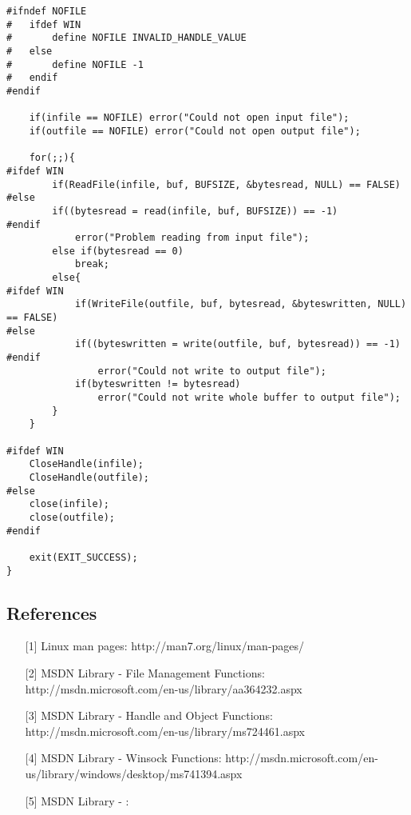 \documentclass[letterpaper,10pt,fleqn]{article}
\numberwithin{equation}{section}
\begin{document}
\begin{verbatim}
#ifndef NOFILE
#   ifdef WIN
#       define NOFILE INVALID_HANDLE_VALUE
#   else
#       define NOFILE -1
#   endif
#endif

    if(infile == NOFILE) error("Could not open input file");
    if(outfile == NOFILE) error("Could not open output file");

    for(;;){
#ifdef WIN
        if(ReadFile(infile, buf, BUFSIZE, &bytesread, NULL) == FALSE)
#else
        if((bytesread = read(infile, buf, BUFSIZE)) == -1)
#endif
            error("Problem reading from input file");
        else if(bytesread == 0)
            break;
        else{
#ifdef WIN
            if(WriteFile(outfile, buf, bytesread, &byteswritten, NULL) == FALSE)
#else
            if((byteswritten = write(outfile, buf, bytesread)) == -1)
#endif
                error("Could not write to output file");
            if(byteswritten != bytesread)
                error("Could not write whole buffer to output file");
        }
    }

#ifdef WIN
    CloseHandle(infile);
    CloseHandle(outfile);
#else
    close(infile);
    close(outfile);
#endif

    exit(EXIT_SUCCESS);
}
\end{verbatim}

\subsection*{References}

\begin{itemize}
    \item[{[}1{]}] Linux man pages: http://man7.org/linux/man-pages/
    \item[{[}2{]}] MSDN Library - File Management Functions: http://msdn.microsoft.com/en-us/library/aa364232.aspx
    \item[{[}3{]}] MSDN Library - Handle and Object Functions: http://msdn.microsoft.com/en-us/library/ms724461.aspx
    \item[{[}4{]}] MSDN Library - Winsock Functions: http://msdn.microsoft.com/en-us/library/windows/desktop/ms741394.aspx
    \item[{[}5{]}] MSDN Library - : 
\end{itemize}
\end{document}
